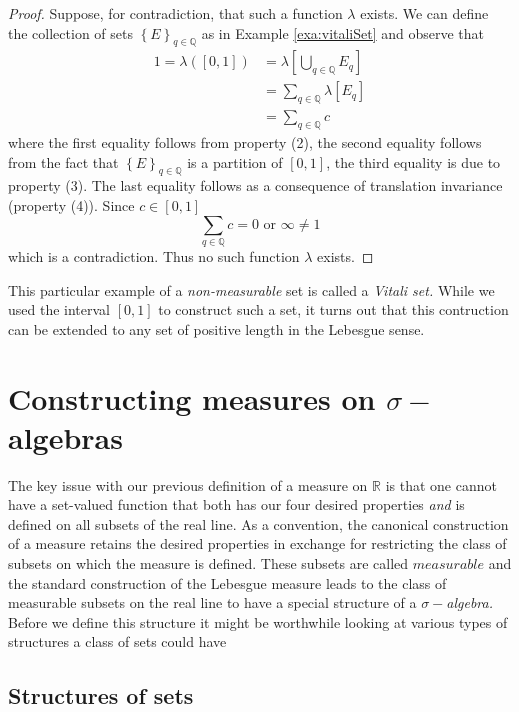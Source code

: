 \begin{proof}
Suppose, for contradiction, that such a function $\lambda$ exists.
We can define the collection of sets $\left\{ E\right\} _{q\in\mathbb{Q}}$
as in Example \ref{exa:vitaliSet} and observe that
\begin{align*}
1=\lambda\left(\left[0,1\right]\right) & =\lambda\left[\bigcup_{q\in\mathbb{Q}}E_{q}\right]\\
 & =\sum_{q\in\mathbb{Q}}\lambda\left[E_{q}\right]\\
 & =\sum_{q\in\mathbb{Q}}c
\end{align*}
where the first equality follows from property (2), the second equality
follows from the fact that $\left\{ E\right\} _{q\in\mathbb{Q}}$
is a partition of $\left[0,1\right]$, the third equality is due to
property (3). The last equality follows as a consequence of translation
invariance (property (4)). Since $c\in\left[0,1\right]$
\[
\sum_{q\in\mathbb{Q}}c=0\text{ or }\infty\neq1
\]
which is a contradiction. Thus no such function $\lambda$ exists.
\end{proof}
This particular example of a \emph{non-measurable }set is called a
\emph{Vitali set. }While we used the interval $\left[0,1\right]$
to construct such a set, it turns out that this contruction can be
extended to any set of positive length in the Lebesgue sense.

\section{Constructing measures on $\sigma-$algebras}

The key issue with our previous definition of a measure on $\mathds{R}$
is that one cannot have a set-valued function that both has our four
desired properties \emph{and }is defined on all subsets of the real
line. As a convention, the canonical construction of a measure retains
the desired properties in exchange for restricting the class of subsets
on which the measure is defined. These subsets are called $measurable$
and the standard construction of the Lebesgue measure leads to the
class of measurable subsets on the real line to have a special structure
of a \emph{$\sigma-$algebra. }Before we define this structure it
might be worthwhile looking at various types of structures a class
of sets could have

\subsection{Structures of sets}

